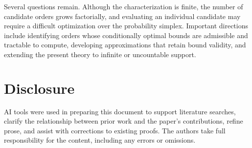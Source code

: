 \documentclass{article}
\theoremstyle{definition}
\theoremstyle{remark}
\begin{document}
Several questions remain. Although the characterization is finite, the number of candidate orders grows factorially, and evaluating an individual candidate may require a difficult optimization over the probability simplex. Important directions include identifying orders whose conditionally optimal bounds are admissible and tractable to compute, developing approximations that retain bound validity, and extending the present theory to infinite or uncountable support.
\color{black}

\section{Disclosure}

AI tools were used in preparing this document to support literature searches, clarify the relationship between prior work and the paper’s contributions, refine prose, and assist with corrections to existing proofs. The authors take full responsibility for the content, including any errors or omissions.

  

\end{document}
